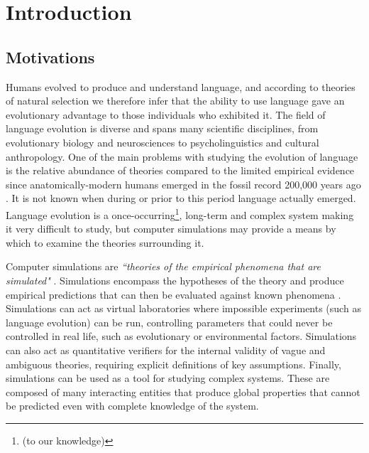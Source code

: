 \documentclass[12pt,a4paper,twoside,openright]{report}
\begin{document}

\pagestyle{headings}

\chapter{Introduction}

\section{Motivations}

Humans evolved to produce and understand language, and according to theories of natural selection we therefore infer that the ability to use language gave an evolutionary advantage to those individuals who exhibited it. The field of language evolution is diverse and spans many scientific disciplines, from evolutionary biology and neurosciences to psycholinguistics and cultural anthropology. One of the main problems with studying the evolution of language is the relative abundance of theories compared to the limited empirical evidence since anatomically-modern humans emerged in the fossil record 200,000 years ago \citep{Fleagle2008}. It is not known when during or prior to this period language actually emerged. Language evolution is a once-occurring\footnote{(to our knowledge)}, long-term and complex system making it very difficult to study, but computer simulations may provide a means by which to examine the theories surrounding it.

Computer simulations are \emph{``theories of the empirical phenomena that are simulated"} \citep{cangelosi2012simulating}. Simulations encompass the hypotheses of the theory and produce empirical predictions that can then be evaluated against known phenomena \citep{cavalli1997genes}. Simulations can act as virtual laboratories where impossible experiments (such as language evolution) can be run, controlling parameters that could never be controlled in real life, such as evolutionary or environmental factors. Simulations can also act as quantitative verifiers for the internal validity of vague and ambiguous theories, requiring explicit definitions of key assumptions. Finally, simulations can be used as a tool for studying complex systems. These are composed of many interacting entities that produce global properties that cannot be predicted even with complete knowledge of the system.
\end{document}
